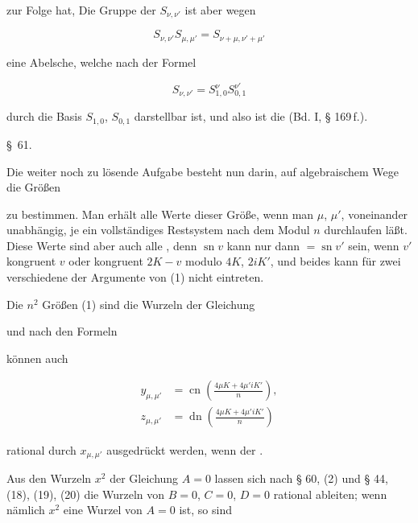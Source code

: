 
zur Folge hat,  Die Gruppe
der $S_{\nu,\nu'}$ ist aber wegen

\[
S_{\nu,\nu'} S_{\mu,\mu'} = S_{\nu+\mu,\nu'+\mu'}
\]

eine Abelsche, welche nach der Formel

\[
S_{\nu,\nu'} = S_{1,0}^{\nu} S_{0,1}^{\nu'}
\]

durch die Basis $S_{1,0}$, $S_{0,1}$ darstellbar ist, und also ist die  (Bd. I, § 169\,f.).

\begin{center}
\S\ 61. \quad {}
\end{center}

Die weiter noch zu lösende Aufgabe besteht nun darin, auf
algebraischem Wege die Größen


zu bestimmen. Man erhält alle Werte dieser Größe, wenn man
$\mu$, $\mu'$, voneinander unabhängig, je ein vollständiges Restsystem
nach dem Modul $n$ durchlaufen läßt. Diese Werte sind aber
auch alle , denn $\operatorname{sn} v$ kann nur dann
$= \operatorname{sn} v'$ sein, wenn $v'$ kongruent $v$ oder kongruent $2K - v$
modulo $4K$, $2iK'$, und beides kann für zwei verschiedene der
Argumente von (1) nicht eintreten.

Die $n^2$ Größen (1) sind die Wurzeln der Gleichung


und nach den Formeln


können auch

\[
\begin{aligned}
y_{\mu,\mu'} &= \operatorname{cn}\left(\frac{4\mu K + 4\mu' iK'}{n}\right),\\
z_{\mu,\mu'} &= \operatorname{dn}\left(\frac{4\mu K + 4\mu' iK'}{n}\right)
\end{aligned}
\]

rational durch $x_{\mu,\mu'}$ ausgedrückt werden, wenn der .

Aus den Wurzeln $x^2$ der Gleichung $A = 0$ lassen sich nach
§ 60, (2) und § 44, (18), (19), (20) die Wurzeln von $B = 0$,
$C = 0$, $D = 0$ rational ableiten; wenn nämlich $x^2$ eine Wurzel
von $A = 0$ ist, so sind
